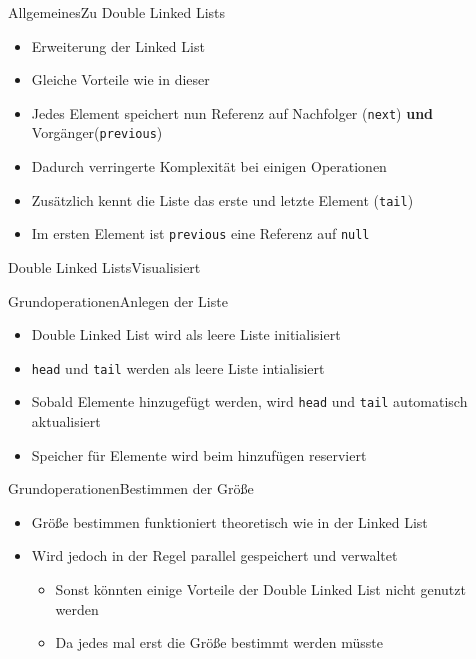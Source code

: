 \begin{frame}{Allgemeines}{Zu Double Linked Lists}
	\begin{itemize}
		\item Erweiterung der Linked List
		\item Gleiche Vorteile wie in dieser
		\item Jedes Element speichert nun Referenz auf Nachfolger (\texttt{next}) \textbf{und} Vorgänger(\texttt{previous})
		\item Dadurch verringerte Komplexität bei einigen Operationen
		\item Zusätzlich kennt die Liste das erste und letzte Element (\texttt{tail})
		\item Im ersten Element ist \texttt{previous} eine Referenz auf \texttt{null}
	\end{itemize}
\end{frame}

\begin{frame}{Double Linked Lists}{Visualisiert}
\end{frame}

\begin{frame}{Grundoperationen}{Anlegen der Liste}
	\begin{itemize}
		\item Double Linked List wird als leere Liste initialisiert
		\item \texttt{head} und \texttt{tail} werden als leere Liste intialisiert
		\item Sobald Elemente hinzugefügt werden, wird \texttt{head} und \texttt{tail} automatisch aktualisiert
		\item Speicher für Elemente wird beim hinzufügen reserviert
	\end{itemize}
\end{frame}

\begin{frame}{Grundoperationen}{Bestimmen der Größe}
	\begin{itemize}
		\item Größe bestimmen funktioniert theoretisch wie in der Linked List
		\item Wird jedoch in der Regel parallel gespeichert und verwaltet
		\begin{itemize}
			\item Sonst könnten einige Vorteile der Double Linked List nicht genutzt werden
			\item Da jedes mal erst die Größe bestimmt werden müsste
		\end{itemize}
	\end{itemize}
\end{frame}

